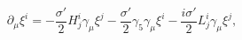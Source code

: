 \begin{equation}
  \partial_\mu\xi^i 
    = -\frac{\sigma'}{2} H^i_j\gamma_\mu\xi^j
      -\frac{\sigma'}{2} \gamma_5\gamma_\mu\xi^i
      -\frac{i\sigma'}{2} L^i_j\gamma_\mu\xi^j,
\label{eq:killingspinoransatz2}
\end{equation}

